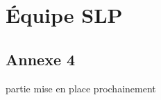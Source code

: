 \documentclass[]{rapportLS2N}
\newcommand{\whoami}{SLP}
\begin{document}
\sloppy


\thispagestyle{fancy}
\tableofcontents




\part{Équipe \whoami}





\chapter{Annexe 4}

partie mise en place prochainement
%


\end{document}
